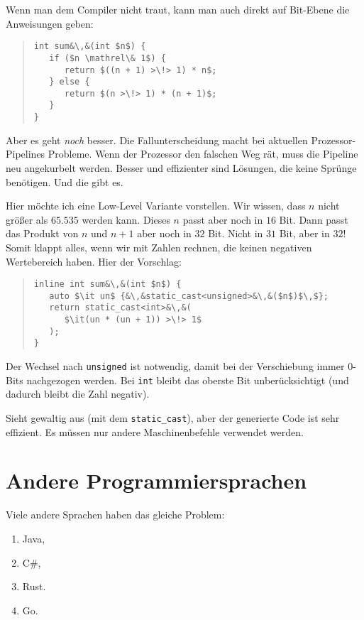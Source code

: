 \documentclass[a5paper,landscape,ngerman,10pt]{article}
\begin{document}
Wenn man dem Compiler nicht traut, kann man auch direkt
auf Bit-Ebene die Anweisungen geben:

\begin{quotation}
\begin{lstlisting}
int sum&\,&(int $n$) {
   if ($n \mathrel\& 1$) {
      return $((n + 1) >\!> 1) * n$;
   } else {
      return $(n >\!> 1) * (n + 1)$;
   }
}
\end{lstlisting}
\end{quotation}

Aber es geht {\it noch\/} besser.
Die Fallunterscheidung macht bei aktuellen Prozessor-Pipelines
Probleme.
Wenn der Prozessor den falschen Weg rät, muss die
Pipeline neu angekurbelt werden.
Besser und effizienter sind Lösungen, die keine
Sprünge benötigen.
Und die gibt es.

Hier möchte ich eine Low-Level Variante vorstellen.
Wir wissen, dass $n$ nicht größer als $65.535$ werden
kann.
Dieses $n$ passt aber noch in $16$ Bit.
Dann passt das Produkt von $n$ und $n+1$ aber noch in
$32$ Bit.
Nicht in $31$ Bit, aber in $32$!
Somit klappt alles, wenn wir mit Zahlen rechnen, die
keinen negativen Wertebereich haben.
Hier der Vorschlag:

\begin{quotation}
\begin{lstlisting}
inline int sum&\,&(int $n$) {
   auto $\it un$ {&\,&static_cast<unsigned>&\,&($n$)$\,$};
   return static_cast<int>&\,&(
      $\it(un * (un + 1)) >\!> 1$
   );
}
\end{lstlisting}
\end{quotation}

Der Wechsel nach \lstinline!unsigned! ist notwendig, damit
bei der Verschiebung immer $0$-Bits nachgezogen werden.
Bei \lstinline!int! bleibt das oberste Bit unberücksichtigt
(und dadurch bleibt die Zahl negativ).

Sieht gewaltig aus (mit dem \lstinline!static_cast!), aber
der generierte Code ist sehr effizient.
Es müssen nur andere Maschinenbefehle verwendet werden.

\section{Andere Programmiersprachen}

Viele andere Sprachen haben das gleiche Problem:

\begin{enumerate}
 \item Java,
 \item C\#,
 \item Rust.
 \item Go.
\end{enumerate}
\end{document}
